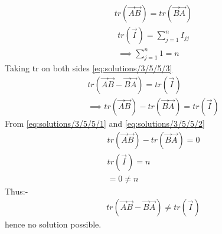 
\begin{align}
 tr(\vec{A}\vec{B}) = tr(\vec{B}\vec{A})\label{eq:solutions/3/5/5/1}   
\end{align}
\begin{align}
    tr(\vec{I})=\sum_{j=1}^{n} I_{jj} \\ 
    \implies\sum_{j=1}^{n}1=n\label{eq:solutions/3/5/5/2}
\end{align}
Taking tr on both sides \eqref{eq:solutions/3/5/5/3}
\begin{align}
  tr(\vec{A}\vec{B}-\vec{B}\vec{A})=tr(\vec{I})\\
 \implies tr(\vec{A}\vec{B})-tr(\vec{B}\vec{A})=tr(\vec{I})
\end{align}
From \eqref{eq:solutions/3/5/5/1} and \eqref{eq:solutions/3/5/5/2}
\begin{align}
    tr(\vec{A}\vec{B})-tr(\vec{B}\vec{A})=0\\
    tr(\vec{I})=n\\
    =0\neq n
\end{align}
Thus:-
\begin{align}
  tr(\vec{A}\vec{B}-\vec{B}\vec{A}) \neq tr(\vec{I})  
\end{align}
hence no solution possible.
